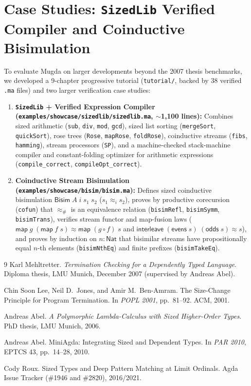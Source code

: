 \documentclass[11pt,a4paper]{article}
\begin{document}
\section{Case Studies: \texttt{SizedLib} Verified Compiler and Coinductive Bisimulation}

To evaluate Mugda on larger developments beyond the 2007 thesis benchmarks, we developed a 9-chapter progressive tutorial (\texttt{tutorial/}, backed by 38 verified \texttt{.ma} files) and two larger verification case studies:
\begin{enumerate}
  \item \textbf{\texttt{SizedLib} + Verified Expression Compiler (\texttt{examples/showcase/sizedlib/sizedlib.ma}, $\sim$1,100 lines):}
  Combines sized arithmetic (\texttt{sub}, \texttt{div}, \texttt{mod}, \texttt{gcd}), sized list sorting (\texttt{mergeSort}, \texttt{quickSort}), rose trees (\texttt{Rose}, \texttt{mapRose}, \texttt{foldRose}), coinductive streams (\texttt{fibs}, \texttt{hamming}), stream processors (\texttt{SP}), and a machine-checked stack-machine compiler and constant-folding optimizer for arithmetic expressions (\texttt{compile\_correct}, \texttt{compileOpt\_correct}).
  \item \textbf{Coinductive Stream Bisimulation (\texttt{examples/showcase/bisim/bisim.ma}):}
  Defines sized coinductive bisimulation $\mathsf{Bisim}\;A\;i\;s_1\;s_2$ ($s_1 \approx_i s_2$), proves by productive corecursion (\texttt{cofun}) that $\approx_\#$ is an equivalence relation (\texttt{bisimRefl}, \texttt{bisimSymm}, \texttt{bisimTrans}), verifies stream functor and map-fusion laws ($\mathsf{map}\;g\;(\mathsf{map}\;f\;s) \approx \mathsf{map}\;(g \circ f)\;s$ and $\mathsf{interleave}\;(\mathsf{evens}\;s)\;(\mathsf{odds}\;s) \approx s$), and proves by induction on $n : \mathsf{Nat}$ that bisimilar streams have propositionally equal $n$-th elements (\texttt{bisimNthEq}) and finite prefixes (\texttt{bisimTakeEq}).
\end{enumerate}

\begin{thebibliography}{9}
Karl Mehltretter.
\newblock \emph{Termination Checking for a Dependently Typed Language}.
\newblock Diploma thesis, LMU Munich, December 2007 (supervised by Andreas Abel).

Chin Soon Lee, Neil D.\ Jones, and Amir M.\ Ben-Amram.
\newblock The Size-Change Principle for Program Termination.
\newblock In \emph{POPL 2001}, pp.\ 81--92. ACM, 2001.

Andreas Abel.
\newblock \emph{A Polymorphic Lambda-Calculus with Sized Higher-Order Types}.
\newblock PhD thesis, LMU Munich, 2006.

Andreas Abel.
\newblock MiniAgda: Integrating Sized and Dependent Types.
\newblock In \emph{PAR 2010}, EPTCS 43, pp.\ 14--28, 2010.

Cody Roux.
\newblock Sized Types and Deep Pattern Matching at Limit Ordinals.
\newblock Agda Issue Tracker (\#1946 and \#2820), 2016/2021.
\end{thebibliography}
\end{document}
